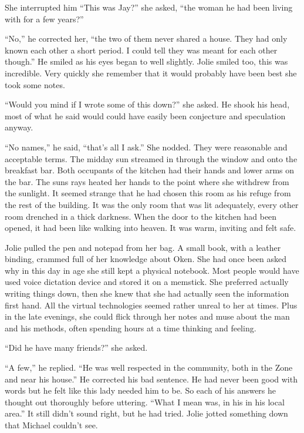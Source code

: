 She interrupted him ``This was Jay?'' she asked, ``the woman he had been living with for a few years?''

``No,'' he corrected her, ``the two of them never shared a house.  They had only known each other a short period.  I could tell they was meant for each other though.''  He smiled as his eyes began to well slightly.  Jolie smiled too, this was incredible.  Very quickly she remember that it would probably have been best she took some notes.

``Would you mind if I wrote some of this down?'' she asked.  He shook his head, most of what he said would could have easily been conjecture and speculation anyway.  

``No names,'' he said, ``that's all I ask.''  She nodded.  They were reasonable and acceptable terms.  The midday sun streamed in through the window and onto the breakfast bar.  Both occupants of the kitchen had their hands and lower arms on the bar.  The suns rays heated her hands to the point where she withdrew from the sunlight.  It seemed strange that he had chosen this room as his refuge from the rest of the building.  It was the only room that was lit adequately, every other room drenched in a thick darkness.  When the door to the kitchen had been opened, it had been like walking into heaven.  It was warm, inviting and felt safe.

Jolie pulled the pen and notepad from her bag.  A small book, with a leather binding, crammed full of her knowledge about Oken.  She had once been asked why in this day in age she still kept a physical notebook.  Most people would have used voice dictation device and stored it on a memstick.  She preferred actually writing things down, then she knew that she had actually seen the information first hand.  All the virtual technologies seemed rather unreal to her at times.  Plus in the late evenings, she could flick through her notes and muse about the man and his methods, often spending hours at a time thinking and feeling.

``Did he have many friends?'' she asked.  

``A few,'' he replied.  ``He was well respected in the community, both in the Zone and near his house.''  He corrected his bad sentence.  He had never been good with words but he felt like this lady needed him to be.  So each of his answers he thought out thoroughly before uttering.  ``What I mean was, in his in his local area.''  It still didn't sound right, but he had tried.  Jolie jotted something down that Michael couldn't see.

